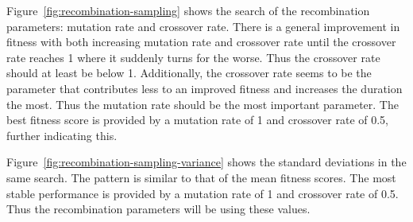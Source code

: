 Figure~\ref{fig:recombination-sampling} shows the search of the recombination parameters: mutation rate and crossover rate.
There is a general improvement in fitness with both increasing mutation rate and crossover rate until the crossover rate reaches 1 where it suddenly turns for the worse.
Thus the crossover rate should at least be below 1.
Additionally, the crossover rate seems to be the parameter that contributes less to an improved fitness and increases the duration the most.
Thus the mutation rate should be the most important parameter.
The best fitness score is provided by a mutation rate of 1 and crossover rate of 0.5, further indicating this.

Figure~\ref{fig:recombination-sampling-variance} shows the standard deviations in the same search.
The pattern is similar to that of the mean fitness scores.
The most stable performance is provided by a mutation rate of 1 and crossover rate of 0.5.
Thus the recombination parameters will be using these values.

